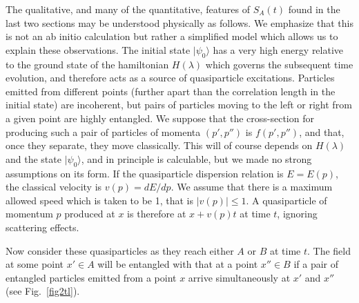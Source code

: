 \documentclass[12pt,preprint,tighten,eqsecnum,aps,floats,psfig,epsfig,amsmath,onecolumn]{revtex4-1}
\begin{document}
The qualitative, and many of the quantitative, features of $S_A(t)$
found in the last two sections may be understood physically as follows.
We emphasize that this is not an ab initio calculation but rather a
simplified model which allows us to explain these observations.
The initial state $|\psi_0\rangle$ has a very high energy relative to
the ground state of the hamiltonian $H(\lambda)$ which governs the 
subsequent time
evolution, and therefore acts as a source of quasiparticle excitations.
Particles emitted from different points (further apart than the
correlation length in the initial state) are incoherent, but pairs of
particles moving to the left or right from a given point are highly
entangled. We suppose that the cross-section for producing such a pair
of particles of momenta $(p',p'')$ is $f(p',p'')$, and that, once they
separate, they move classically. 
This will of course depends on $H(\lambda)$ and the state $|\psi_0\rangle$,
and in principle is calculable, but we made no strong assumptions on its
form. If the quasiparticle dispersion relation
is $E=E(p)$, the classical velocity is $v(p)=dE/dp$. We assume that
there is a maximum allowed speed which is taken to be 1, that is
$|v(p)|\leq 1$. A quasiparticle of momentum $p$ produced at $x$ is
therefore at $x+v(p)t$ at time $t$, ignoring scattering effects.

Now consider these quasiparticles as they reach either $A$ or $B$ at
time $t$. The field at some point $x'\in A$ will be entangled with that
at a point $x''\in B$ if a pair of entangled particles emitted from a
point $x$ arrive simultaneously at $x'$ and $x''$ (see Fig.~\ref{fig2tl}). 
\end{document}

